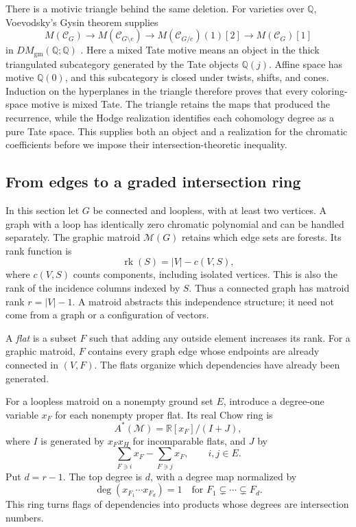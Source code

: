 \documentclass[11pt]{article}
\theoremstyle{definition}
\theoremstyle{remark}
\newcommand{\Q}{\mathbb Q}
\newcommand{\R}{\mathbb R}
\begin{document}
There is a motivic triangle behind the same deletion. For varieties over
$\Q$, Voevodsky's Gysin theorem supplies
\begin{equation}\label{eq:dag-motivic-deletion}
 M(\mathcal C_G)\longrightarrow M(\mathcal C_{G\setminus e})
 \longrightarrow M(\mathcal C_{G/e})(1)[2]
 \longrightarrow M(\mathcal C_G)[1]
\end{equation}
in $DM_{\mathrm{gm}}(\Q;\Q)$
\cite[Proposition 3.5.4]{dagVoevodsky2000}.
Here a mixed Tate motive means an object in the thick triangulated
subcategory generated by the Tate objects $\Q(j)$.
Affine space has motive $\Q(0)$, and this subcategory is closed under
twists, shifts, and cones. Induction on the hyperplanes in the triangle
therefore proves that every coloring-space motive is mixed Tate.
The triangle retains the maps that produced the recurrence, while the
Hodge realization identifies each cohomology degree as a pure Tate space.
This supplies both an object and a realization for the chromatic
coefficients before we impose their intersection-theoretic inequality.


\subsection{From edges to a graded intersection ring}

In this section let $G$ be connected and loopless, with at least two vertices. A graph with a loop has identically zero chromatic polynomial and can be handled separately. The graphic matroid $\mathcal M(G)$ retains which edge sets are forests. Its rank function is
\[
 \operatorname{rk}(S)=|V|-c(V,S),
\]
where $c(V,S)$ counts components, including isolated vertices. This is also the rank of the incidence columns indexed by $S$. Thus a connected graph has matroid rank $r=|V|-1$. A matroid abstracts this independence structure; it need not come from a graph or a configuration of vectors.

A \emph{flat} is a subset $F$ such that adding any outside element increases its rank. For a graphic matroid, $F$ contains every graph edge whose endpoints are already connected in $(V,F)$. The flats organize which dependencies have already been generated.

For a loopless matroid on a nonempty ground set $E$, introduce a degree-one variable $x_F$ for each nonempty proper flat. Its real Chow ring is
\[
 A^*(\mathcal M)=\R[x_F]/(I+J),
\]
where $I$ is generated by $x_Fx_H$ for incomparable flats, and $J$ by
\[
 \sum_{F\ni i}x_F-\sum_{F\ni j}x_F,
 \qquad i,j\in E.
\]
Put $d=r-1$. The top degree is $d$, with a degree map normalized by
\[
 \deg(x_{F_1}\cdots x_{F_d})=1
 \quad\text{for }F_1\subsetneq\cdots\subsetneq F_d.
\]
This ring turns flags of dependencies into products whose degrees are intersection numbers.
\end{document}
